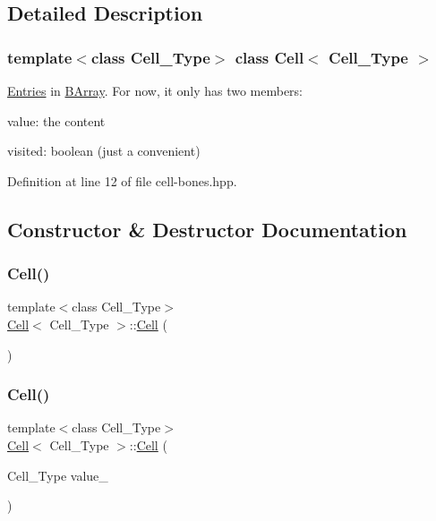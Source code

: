 \subsection{Detailed Description}
\subsubsection*{template$<$class Cell\+\_\+\+Type$>$\newline
class Cell$<$ Cell\+\_\+\+Type $>$}

\hyperlink{class_entries}{Entries} in \hyperlink{class_b_array}{B\+Array}. For now, it only has two members\+: 


\begin{DoxyItemize}
\item value\+: the content
\item visited\+: boolean (just a convenient) 
\end{DoxyItemize}

Definition at line 12 of file cell-\/bones.\+hpp.



\subsection{Constructor \& Destructor Documentation}
\mbox{\label{class_cell_a402912c21a4c87659c0576a4bfa3c48f}} 
\subsubsection{\texorpdfstring{Cell()}{Cell()}\hspace{0.1cm}{\footnotesize\ttfamily [1/10]}}
{\footnotesize\ttfamily template$<$class Cell\+\_\+\+Type$>$ \\
\hyperlink{class_cell}{Cell}$<$ Cell\+\_\+\+Type $>$\+::\hyperlink{class_cell}{Cell} (\begin{DoxyParamCaption}{ }\end{DoxyParamCaption})}

\mbox{\label{class_cell_a2b055170a02db6bc5f5674e81f1dd8d6}} 
\subsubsection{\texorpdfstring{Cell()}{Cell()}\hspace{0.1cm}{\footnotesize\ttfamily [2/10]}}
{\footnotesize\ttfamily template$<$class Cell\+\_\+\+Type$>$ \\
\hyperlink{class_cell}{Cell}$<$ Cell\+\_\+\+Type $>$\+::\hyperlink{class_cell}{Cell} (\begin{DoxyParamCaption}\item[{Cell\+\_\+\+Type}]{value\+\_\+ }\end{DoxyParamCaption})\hspace{0.3cm}{\ttfamily [inline]}}



